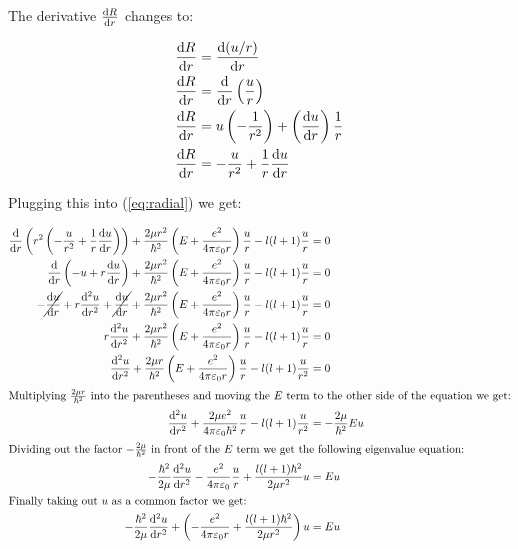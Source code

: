 \documentclass{article}
\begin{document}
    The derivative $\odv{R}{r}$ changes to:

    \begin{align}
        \odv{R}{r} &= \odv{(u/r)}{r} \\ 
        \odv{R}{r} &= \odv{}{r}\left( \frac{u}{r} \right) \\ 
        \odv{R}{r} &= u\left( -\frac{1}{r^2} \right) + \left( \odv{u}{r} \right)\frac{1}{r} \\ 
        \odv{R}{r} &= -\frac{u}{r^2} + \frac{1}{r}\odv{u}{r}
    \end{align}

    Plugging this into (\ref{eq:radial}) we get:

    \begin{align}
        \odv{}{r}\left( r^2\left( -\frac{u}{r^2} + \frac{1}{r}\odv{u}{r} \right)\right) + \frac{2\mu r^2}{\hbar^2}\left( E + \frac{e^2}{4\pi\varepsilon_{0}r} \right)\frac{u}{r} - l(l + 1)\frac{u}{r} &= 0 \\
        \odv{}{r}\left(-u + r\odv{u}{r} \right) + \frac{2\mu r^2}{\hbar^2}\left( E + \frac{e^2}{4\pi\varepsilon_{0}r} \right)\frac{u}{r} - l(l + 1)\frac{u}{r} &= 0 \\
        -\cancel{\odv{u}{r}} + r\odv[order = 2]{u}{r} + \cancel{\odv{u}{r}} + \frac{2\mu r^2}{\hbar^2}\left( E + \frac{e^2}{4\pi\varepsilon_{0}r} \right)\frac{u}{r} - l(l + 1)\frac{u}{r} &= 0 \\
        r\odv[order = 2]{u}{r} + \frac{2\mu r^2}{\hbar^2}\left( E + \frac{e^2}{4\pi\varepsilon_{0}r} \right)\frac{u}{r} - l(l + 1)\frac{u}{r} &= 0 \\
        \odv[order = 2]{u}{r} + \frac{2\mu r}{\hbar^2}\left( E + \frac{e^2}{4\pi\varepsilon_{0}r} \right)\frac{u}{r} - l(l + 1)\frac{u}{r^2} &= 0 \\
        \intertext{Multiplying $\frac{2\mu r}{\hbar^2}$ into the parentheses and moving the $E$ term to the other side of the equation we get:}
        \odv[order = 2]{u}{r} + \frac{2\mu e^2}{4\pi\varepsilon_{0}\hbar^2}\frac{u}{r} - l(l + 1)\frac{u}{r^2} &= -\frac{2\mu}{\hbar^2}Eu \\
        \intertext{Dividing out the factor $-\frac{2\mu}{\hbar^2}$ in front of the $E$ term we get the following eigenvalue equation:}
        -\frac{\hbar^2}{2\mu}\odv[order = 2]{u}{r} - \frac{e^2}{4\pi\varepsilon_{0}}\frac{u}{r} + \frac{l(l + 1)\hbar^2}{2\mu r^2}u &= Eu \\
        \intertext{Finally taking out $u$ as a common factor we get:}
        -\frac{\hbar^2}{2\mu}\odv[order = 2]{u}{r} + \left( -\frac{e^2}{4\pi\varepsilon_{0}r} + \frac{l(l + 1)\hbar^2}{2\mu r^2}\right)u &= Eu
    \end{align}
\end{document}

